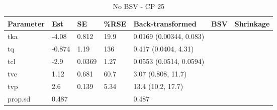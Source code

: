 \begin{table}
\centering\centering
\caption{No BSV - CP 25}
\centering
\fontsize{8}{10}\selectfont
\begin{tabular}[t]{lllllll}
\toprule
\textbf{Parameter} & \textbf{Est} & \textbf{SE} & \textbf{\%RSE} & \textbf{Back-transformed} & \textbf{BSV} & \textbf{Shrinkage}\\
\midrule
tka & -4.08 & 0.812 & 19.9 & 0.0169 (0.00344, 0.083) &  & \\
\midrule
tq & -0.874 & 1.19 & 136 & 0.417 (0.0404, 4.31) &  & \\
\midrule
tcl & -2.9 & 0.0369 & 1.27 & 0.0553 (0.0514, 0.0594) &  & \\
\midrule
tvc & 1.12 & 0.681 & 60.7 & 3.07 (0.808, 11.7) &  & \\
\midrule
tvp & 2.6 & 0.139 & 5.34 & 13.4 (10.2, 17.7) &  & \\
\midrule
prop.sd & 0.487 &  &  & 0.487 &  & \\
\bottomrule
\end{tabular}
\end{table}